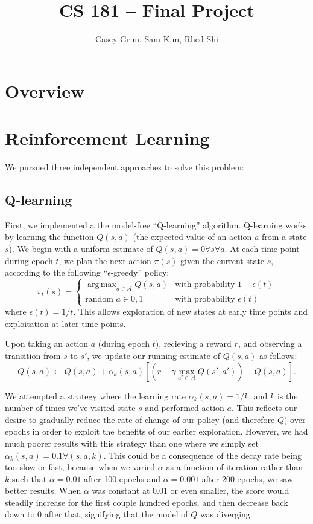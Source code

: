 \documentclass[11pt]{amsart}
\title{CS 181 -- Final Project}
\author{Casey Grun, Sam Kim, Rhed Shi}
\DeclareMathOperator*{\argmax}{arg\,max}
\begin{document}
\maketitle

\section{Overview}

\section{Reinforcement Learning}



We pursued three independent approaches to solve this 
problem:

\subsection{Q-learning}

First, we implemented a the model-free ``Q-learning'' algorithm. Q-learning works
by learning the function $Q(s,a)$ (the expected value of an action $a$ from a 
state $s$). We begin with a uniform estimate of $Q(s,a) = 0 \forall s \forall a$.
At each time point during epoch $t$, we plan the next action $\pi(s)$ given the 
current state $s$, according to the following ``$\epsilon$-greedy'' policy:
$$\pi_t(s) = \begin{cases} 
\argmax_{a \in \mathcal{A}} Q(s,a) & \text{with probability } 1-\epsilon(t) \\
\text{random } a \in {0,1}         & \text{with probability } \epsilon(t) 
\end{cases}$$
where $\epsilon(t) = 1/t$. This allows exploration of new states at early time 
points and exploitation at later time points.

Upon taking an action $a$ (during epoch $t$), recieving a reward $r$, and observing a transition from $s$
to $s'$, we update our running estimate of $Q(s,a)$ as follows:
$$Q(s,a) \gets Q(s,a) + \alpha_k(s,a) \left[ (r + \gamma \max_{a' \in \mathcal{A}} Q(s', a')) - Q(s,a) \right].$$

We attempted a strategy where the learning rate $\alpha_k(s,a) = 1/k$, and $k$ is the number of times we've visited state $s$ and performed action $a$. This reflects our desire to gradually reduce the rate of change of our policy (and therefore $Q$) over epochs in order to exploit the benefits of our earlier exploration. However, we had much poorer results with this strategy than one where we simply set $\alpha_k(s,a) = 0.1 \forall(s,a,k)$. This could be a consequence of the decay rate being too slow or fast, because when we varied $\alpha$ as a function of iteration rather than $k$ such that $\alpha=0.01$ after 100 epochs and $\alpha=0.001$ after 200 epochs, we saw better results. When $\alpha$ was constant at 0.01 or even smaller, the score would steadily increase for the first couple hundred epochs, and then decrease back down to 0 after that, signifying that the model of $Q$ was diverging.
\end{document}
